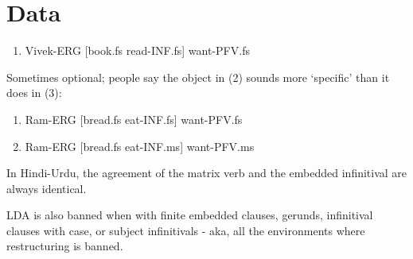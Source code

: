 
\begin{abstract}
\begin{enumerate}
  \item In Hindi-Urdu, verbs agree with the highest non-overtly case-marked argument.
  \item When there's none of these in the matrix clause, and there's an embedded clause under a restructuring verb, and there's an absolutive object there, verbs agree with the absolutive object.
  \item This points to a dissociation between case and agreement, and a relegation of the Activity Condition to Move rather than Agree
\end{enumerate}
\end{abstract}

\section*{Data}

\begin{enumerate}
  \item Vivek-ERG [book.fs read-INF.fs] want-PFV.fs
\end{enumerate}

Sometimes optional; people say the object in (2) sounds more `specific' than it does in (3):

\begin{enumerate}[start=2]
  \item Ram-ERG [bread.fs eat-INF.fs] want-PFV.fs
  \item Ram-ERG [bread.fs eat-INF.ms] want-PFV.ms
\end{enumerate}

In Hindi-Urdu, the agreement of the matrix verb and the embedded infinitival are always identical.

LDA is also banned when with finite embedded clauses, gerunds, infinitival clauses with case, or subject infinitivals - aka, all the environments where restructuring is banned.
